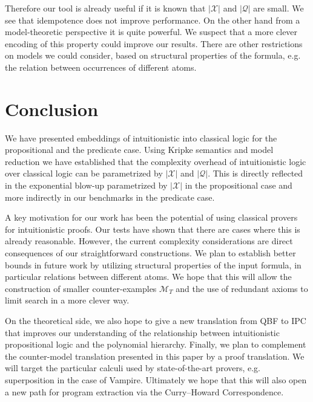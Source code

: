 \documentclass[runningheads]{llncs}
\begin{document}
 Therefore our tool is already useful if it is known that $|\mathcal X|$ and $|\mathcal Q|$ are small. We see that idempotence does not improve performance. On the other hand from a model-theoretic perspective it is quite powerful. We suspect that a more clever encoding of this property could improve our results. There are other restrictions on models we could consider, based on structural properties of the formula, e.g. the relation between occurrences of different atoms.



\section{Conclusion}

We have presented embeddings of intuitionistic into classical logic for the propositional and the predicate case. Using Kripke semantics and model reduction we have established that the complexity overhead of intuitionistic logic over classical logic can be parametrized by $|\mathcal X|$ and $|\mathcal Q|$. This is directly reflected in the exponential blow-up parametrized by $|\mathcal X|$ in the propositional case and more indirectly in our benchmarks in the predicate case.

A key motivation for our work has been the potential of using classical provers for intuitionistic proofs. Our tests have shown that there are cases where this is already reasonable.
However, the current complexity considerations are direct consequences of our straightforward constructions. We plan to establish better bounds in future work by utilizing structural properties of the input formula, in particular relations between different atoms. We hope that this will allow the construction of smaller counter-examples $\mathcal M_T$ and the use of redundant axioms to limit search in a more clever way.

On the theoretical side, we also hope to give a new translation from QBF to IPC that improves our understanding of the relationship between intuitionistic propositional logic and the polynomial hierarchy.
Finally, we plan to complement the counter-model translation presented in this paper by a proof translation.
We will target the particular calculi used by state-of-the-art provers, e.g. superposition in the case of Vampire. Ultimately we hope that this will also open a new path for program extraction via the Curry--Howard Correspondence.



\end{document}
